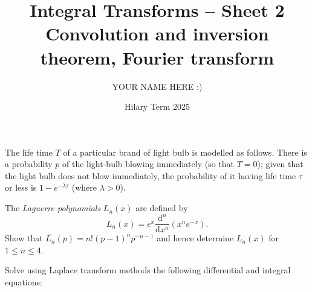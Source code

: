 \documentclass[answers]{exam}
\title{Integral Transforms -- Sheet 2\\Convolution and inversion theorem, Fourier transform}
\author{YOUR NAME HERE :)}
\date{Hilary Term 2025}
\begin{document}
\maketitle
\begin{questions}

\question%
The life time $T$ of a particular brand of light bulb is modelled as follows. There is a probability $p$ of the light-bulb blowing immediately (so that $T=0$); given that the light bulb does not blow immediately, the probability of it having life time $\tau$ or less is $1-e^{-\lambda \tau}$ (where $\lambda>0$).



\question%
The \emph{Laguerre polynomials} $L_{n}(x)$ are defined by \[
	L_{n}(x)=e^{x} \frac{\mathrm{d}^{n}}{\mathrm{d} x^{n}}(x^{n} e^{-x}).
\] Show that $\overline{L_{n}}(p)=n!(p-1)^{n} p^{-n-1}$ and hence determine $L_{n}(x)$ for $1 \leqslant n \leqslant 4$.



\question%
Solve using Laplace transform methods the following differential and integral equations:
\end{questions}
\end{document}
